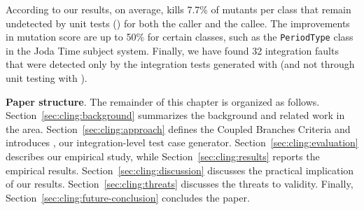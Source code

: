 According to our results, on average, \cling kills 7.7\% of mutants per class that remain undetected by unit tests (\evosuite) for both the caller and the callee. The improvements in mutation score are up to 50\% for certain classes, such as the \texttt{PeriodType} class in the Joda Time subject system.
Finally, we have found 32 integration faults that were detected only by the integration tests generated with \cling (and not through unit testing with \evosuite).


\textbf{Paper structure}. The remainder of this chapter is organized as follows. Section~\ref{sec:cling:background} summarizes the background and related work in the area. %
Section~\ref{sec:cling:approach} defines the Coupled Branches Criteria and introduces \cling, our integration-level test case generator. Section~\ref{sec:cling:evaluation} describes our empirical study, while Section~\ref{sec:cling:results} reports the empirical results. Section~\ref{sec:cling:discussion} discusses the practical implication of our results. Section~\ref{sec:cling:threats} discusses the threats to validity. Finally, Section~\ref{sec:cling:future-conclusion} concludes the paper.



